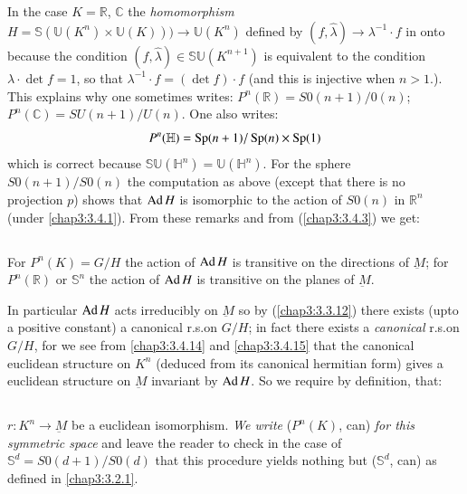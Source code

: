 \setcounter{subsection}{15}
\subsection{}\label{chap3:3.4.16}


\begin{remarks*}
In the case $K=\mathbb{R}$, $\mathbb{C}$ the {\em homomorphism}
$H=\mathbb{S}(\mathbb{U}(K^{n})\times\mathbb{U}(K)))\to
\mathbb{U}(K^{n})$ defined by $(f,\widehat{\lambda})\to
\lambda^{-1}\cdot f$ in onto because the condition
$(f,\widehat{\lambda})\in \mathbb{S}\mathbb{U}(K^{n+1})$ is equivalent
to the condition $\lambda\cdot \det f=1$, so that $\lambda^{-1}\cdot
f=(\det f)\cdot f$ (and this is injective when $n>1$.). This explains
why one sometimes writes: $P^{n}(\mathbb{R})=S0(n+1)/0(n)$;
$P^{n}(\mathbb{C})=SU(n+1)/U(n)$. One also writes:
$$
P^{n}(\mathbb{H})=\operatorname{Sp}(n+1)/\operatorname{Sp}(n)\times \operatorname{Sp}(1)
$$
which is correct because
$\mathbb{S}\mathbb{U}(\mathbb{H}^{n})=\mathbb{U}(\mathbb{H}^{n})$. For
the sphere $S0(n+1)/S0(n)$ the computation as above (except that there
is no projection $p$) shows that $\operatorname{Ad} H$ is isomorphic to the action
of $S0(n)$ in \pageoriginale $\mathbb{R}^{n}$ (under
\eqref{chap3:3.4.1}). From these remarks and from (\ref{chap3:3.4.3}) we get:
\end{remarks*}

\subsection{}\label{chap3:3.4.17}

\begin{prop*}
For $P^{n}(K)=G/H$ the action of $\operatorname{Ad} H$ is transitive on the
directions of $\underbar{M}$; for $P^{n}(\mathbb{R})$ or
$\mathbb{S}^{n}$ the action of $\operatorname{Ad} H$ is transitive on the planes of
$\underbar{M}$.
\end{prop*}

In particular $\operatorname{Ad} H$ acts irreducibly on $\underbar{M}$ so by
(\ref{chap3:3.3.12}) there exists (upto a positive constant) a canonical
r.s.\@ on $G/H$; in fact there exists a {\em canonical} r.s.\@ on
$G/H$, for we see from \eqref{chap3:3.4.14} and \eqref{chap3:3.4.15} that the
canonical euclidean structure on $K^{n}$ (deduced from its canonical
hermitian form) gives a euclidean structure on $\underbar{M}$
invariant by $\operatorname{Ad} H$. So we require by definition, that: 

\subsection{}\label{chap3:3.4.18} 
$r:K^{n}\to \underbar{M}$ be a euclidean isomorphism. {\em We
  write} ($P^{n}(K)$, can) {\em for this symmetric space} and leave
the reader to check in the case of $\mathbb{S}^{d}=S0(d+1)/S0(d)$ that
this procedure yields nothing but ($\mathbb{S}^{d}$, can) as defined
in \ref{chap3:3.2.1}.


